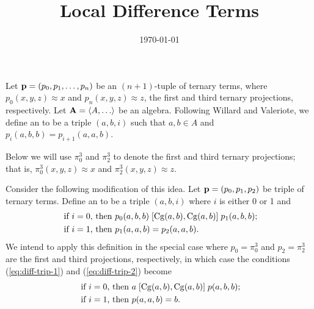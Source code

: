 \documentclass[11pt]{amsart}
\numberwithin{equation}{section}
\theoremstyle{plain}
\theoremstyle{definition}
\begin{document}
\title{Local Difference Terms}
\date{\today}
\address{University of Hawaii}


\maketitle



Let $\mathbf{p} = (p_0, p_1, \dots, p_n)$ be an $(n+1)$-tuple of ternary terms, where
$p_0(x,y,z) \approx x$ and $p_n(x,y,z) \approx z$, the first and third
ternary projections, respectively. 
Let $\bA=\< A, \dots\>$ be an algebra.
Following Willard and Valeriote, we define an 
to be a triple $(a,b,i)$ such that $a, b \in A$ and
$p_i(a,b,b) = p_{i+1}(a,a,b)$.

Below we will use  $\pi^3_0$ and $\pi^3_2$
to denote the first and third ternary projections; that is,
$\pi^3_0(x,y,z) \approx x$ and $\pi^3_2(x,y,z) \approx z$.

Consider the following modification of this idea.  Let $\mathbf{p} = (p_0, p_1, p_2)$
be triple of ternary terms. Define an
to be a triple $(a,b,i)$ where $i$ is either 0 or 1 and 
\begin{align}
\text{ if $i=0$, then } & p_0(a,b,b) \mathrel{[\operatorname{Cg}(a,b), \operatorname{Cg}(a,b)]} p_1(a,b,b); \label{eq:diff-trip-1}\\
\text{ if $i=1$, then } &p_1(a,a,b) = p_2(a,a,b). \label{eq:diff-trip-2}
\end{align}
We intend to apply this definition in the special case where
$p_0 = \pi^3_0$ and
$p_2 = \pi^3_2$ are the first and third projections, respectively, in which case
the conditions (\ref{eq:diff-trip-1}) and (\ref{eq:diff-trip-2}) become
\begin{align*}
\text{ if $i=0$, then } &a \mathrel{[\operatorname{Cg}(a,b), \operatorname{Cg}(a,b)]} p(a,b,b); \\
\text{ if $i=1$, then } &p(a,a,b) =b.
\end{align*}
\end{document}
